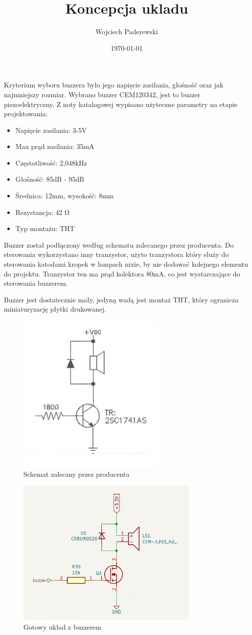 \documentclass[../../main.tex]{subfiles}
\author{Wojciech Paderewski}
\date{\today}
\title{Koncepcja ukladu}
\begin{document}
Kryterium wyboru buzzera było jego napięcie zasilania, głośność oraz jak najmniejszy rozmiar.
Wybrano buzzer CEM120342, jest to buzzer piezoelektryczny. Z noty katalogowej\cite{st:buzzer} wypisano użyteczne parametry na etapie projektowania:

\begin{itemize}
    \item Napięcie zasilania: 3-5V
    \item Max prąd zasilania: 35mA
    \item Częstotliwość: 2,048kHz
    \item Głośność: 85dB - 95dB
    \item Średnica: 12mm, wysokość: 8mm
    \item Rezystancja: 42 \si{\ohm}
    \item Typ montażu: THT
\end{itemize}

Buzzer został podłączony według schematu zalecanego przez producenta. Do sterowania wykorzystano inny tranzystor,
użyto tranzystora który służy do sterowania katodami kropek w lampach nixie, by nie dodawać kolejnego elementu do projektu.
Tranzystor ten ma prąd kolektora 80mA, co jest wystarczające do sterowania buzzerem.

Buzzer jest dostatecznie mały, jedyną wadą jest montaż THT, który ogranicza miniaturyzację płytki drukowanej.

\begin{figure}[H]
    \centering
    \includegraphics[width=0.65\textwidth]{buzzer_karta.png}
    \caption{Schemat zalecany przez producenta\cite{st:buzzer}}
\end{figure}

\begin{figure}[H]
    \centering
    \includegraphics[width=0.8\textwidth]{buzzer.png}
    \caption{Gotowy układ z buzzerem}
\end{figure}
\end{document}
